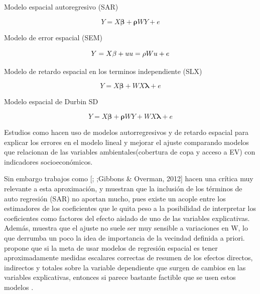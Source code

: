 \documentclass[12pt,]{book}
\begin{document}
Modelo espacial autoregresivo (SAR)

\begin{equation}
Y=X\mathbf{\beta}+\mathbf{\rho}WY+e
\label{eq:sar}
\end{equation}

Modelo de error espacial (SEM)

\begin{equation}
Y=X\mathbf{\beta}+u \\
u=\mathbf{\rho}Wu+e
\label{eq:sem}
\end{equation}

Modelo de retardo espacial en los terminos independiente (SLX)

\begin{equation}
Y=X\mathbf{\beta}+WX\mathbf{\lambda}+e
\label{eq:slx}
\end{equation}

Modelo espacial de Durbin SD

\begin{equation}
Y=X\mathbf{\beta}+\mathbf{\rho}WY+WX\mathbf{\lambda}+e
\label{eq:sd}
\end{equation}

Estudios como
\citep{landry_street_2009, schwarz_trees_2015, zhou_social_2013, shanahan_socio-economic_2014}
hacen uso de modelos autorregresivos y de retardo espacial para explicar
los errores en el modelo lineal y mejorar el ajuste comparando modelos
que relacionan de las variables ambientales(cobertura de copa y acceso a
EV) con indicadores socioeconómicos.

Sin embargo trabajos como {[}\citet{lesage_biggest_2014};
\citet{kissling_spatial_2008};Gibbons \& Overman, 2012{]} hacen una
crítica muy relevante a esta aproximación, y muestran que la inclusión
de los términos de auto regresión (SAR) no aportan mucho, pues existe un
acople entre los estimadores de los coeficientes que le quita peso a la
posibilidad de interpretar los coeficientes como factores del efecto
aislado de uno de las variables explicativas. Además, muestra que el
ajuste no suele ser muy sensible a variaciones en W, lo que derrumba un
poco la idea de importancia de la vecindad definida a priori.
\citep{lesage_biggest_2014} propone que si la meta de usar modelos de
regresión espacial es tener aproximadamente medidas escalares correctas
de resumen de los efectos directos, indirectos y totales sobre la
variable dependiente que surgen de cambios en las variables
explicativas, entonces si parece bastante factible que se usen estos
modelos \citep{lesage_biggest_2014}.
\end{document}
